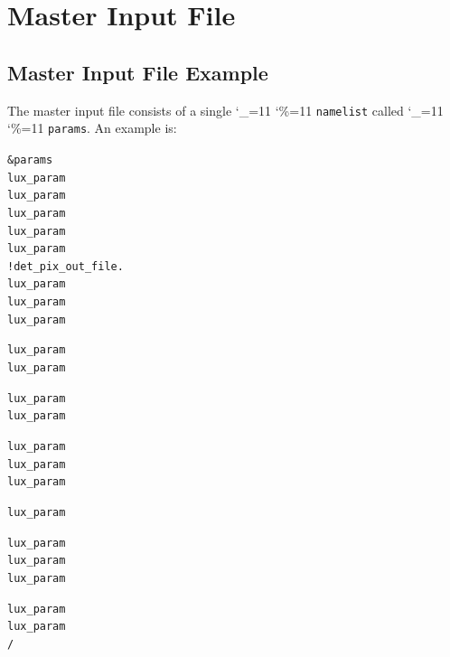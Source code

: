 \documentclass[11pt]{article}
\newcommand\ttcmd{\begingroup\catcode`\_=11 \catcode`\%=11 \dottcmd}
\newcommand\dottcmd[1]{\texttt{#1}\endgroup}
\newcommand{\vn}{\ttcmd}
\newenvironment{example}
  {\vspace{\ExBeg} \begin{alltt}}
  {\end{alltt} \vspace{\ExEnd}}
\newlength{\ExBeg}
\newlength{\ExEnd}
\begin{document}
\section{Master Input File} 
\label{s:master.file}

\subsection{Master Input File Example}
\label{ss:master.example}

The master input file consists of a single \vn{namelist} called \vn{params}.
An example is:
\begin{example}
  &params
    lux_param%
    lux_param%
    lux_param%
    lux_param%
    lux_param%
                                                 !             det_pix_out_file.
    lux_param%
    lux_param%
    lux_param%

    lux_param%
    lux_param%

    lux_param%
    lux_param%

    lux_param%
    lux_param%
    lux_param%

    lux_param%

    lux_param%
    lux_param%
    lux_param%

    lux_param%
    lux_param%
  /
\end{example}
\end{document}
